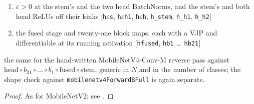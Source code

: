 \begin{theorem}
  \label{thm:mobilenetv4_whole_back}
  \leanok
  \Assume{}
  \begin{enumerate}
    \item \(\varepsilon > 0\) at the stem's and the two head BatchNorms, and
          the stem's and both head ReLUs off their kinks
          \hfill[\texttt{h\(\varepsilon\)s}, \texttt{h\(\varepsilon\)h1}, \texttt{h\(\varepsilon\)h}, \texttt{h\_stem}, \texttt{h\_h1}, \texttt{h\_h2}]
    \item the fused stage and twenty-one block maps, each with a VJP and
          differentiable at its running activation
          \hfill[\texttt{hfused}, \texttt{hb1} \dots\ \texttt{hb21}]
  \end{enumerate}
  \Prove{} the same for the hand-written MobileNetV4-Conv-M reverse pass
  against
  \(\mathrm{head} \circ b_{21} \circ \dots \circ b_1 \circ \mathrm{fused} \circ \mathrm{stem}\),
  generic in \(N\) and in the number of classes; the shape check against
  \texttt{mobilenetv4ForwardBFull} is again separate.
\end{theorem}

\begin{proof}
\leanok
As for MobileNetV2; see .
\end{proof}

